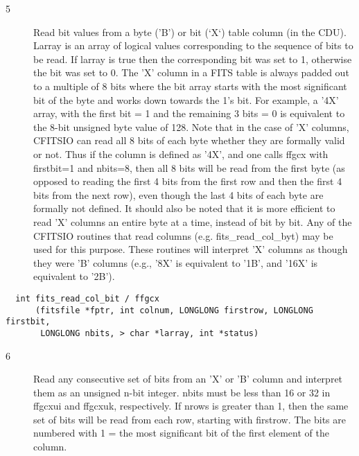 \documentclass[11pt]{book}
\begin{document}
\begin{description}
\item[5 ] Read bit values from a byte ('B') or bit (`X`) table column (in the
    CDU).  Larray is an array of logical values corresponding to the
    sequence of bits to be read.  If larray is true then the
    corresponding bit was set to 1, otherwise the bit was set to 0.
    The 'X' column in a FITS table is always padded out to a multiple
    of 8 bits where the bit array starts with the most significant bit
    of the byte and works down towards the 1's bit.  For example, a
    '4X' array, with the first bit = 1 and the remaining 3 bits = 0 is
    equivalent to the 8-bit unsigned byte value of 128.
    Note that in the case of 'X' columns, CFITSIO can read  all 8 bits
    of each byte whether they are formally valid or not.  Thus if the
    column is defined as '4X', and one calls ffgcx with  firstbit=1 and
    nbits=8, then all 8 bits will be read from the first byte (as
    opposed to reading the first 4 bits from the first row and then the
    first 4 bits from the next row), even though the last 4 bits of
    each byte are formally not defined.  It should also be noted that
    it is more efficient to read 'X' columns an entire byte at a time,
    instead of bit by bit.  Any of the CFITSIO routines that read
    columns (e.g. fits\_read\_col\_byt) may be used for this
    purpose.  These routines will interpret 'X' columns as though they
    were 'B' columns (e.g.,  '8X' is equivalent to '1B', and '16X' is
   equivalent to '2B').  \label{ffgcx}
\end{description}

\begin{verbatim}
  int fits_read_col_bit / ffgcx
      (fitsfile *fptr, int colnum, LONGLONG firstrow, LONGLONG firstbit,
       LONGLONG nbits, > char *larray, int *status)
\end{verbatim}

\begin{description}
\item[6 ] Read any consecutive set of bits from an 'X' or 'B' column and
    interpret them as an unsigned n-bit integer.  nbits must be less
    than 16 or 32 in ffgcxui and ffgcxuk, respectively.  If nrows
    is greater than 1, then the same set of bits will be read from
    each row, starting with firstrow. The bits are numbered with
    1 = the most significant bit of the first element of the column.
   \label{ffgcxui}
\end{description}
\end{document}
